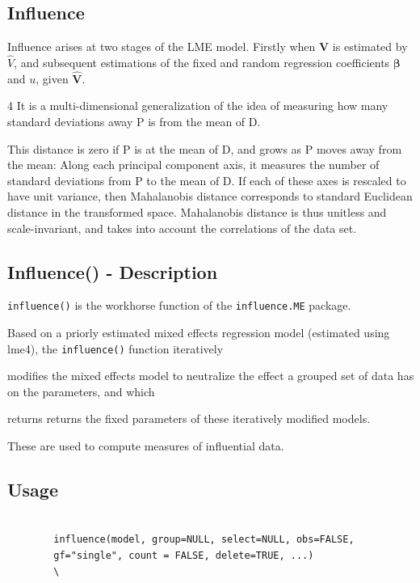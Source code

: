 	
	
	\subsection{Influence}
	
	Influence arises at two stages of the LME model. Firstly when $\mathbf{V}$ is estimated by $\hat{V}$, and subsequent
	estimations of the fixed and random regression coefficients $\mathbf{\beta}$ and $u$, given $\mathbf{\hat{V}}$.
	
	4 It is a multi-dimensional generalization of the idea of measuring how many standard deviations away P is from the mean of D. 
	
	This distance is zero if P is at the mean of D, and grows as P moves away from the mean: Along each principal component axis, it measures the 
	number of standard deviations from P to the mean of D. If each of these axes is rescaled to have unit variance, then Mahalanobis distance corresponds to standard Euclidean distance in the transformed space. Mahalanobis distance is thus unitless and scale-invariant, and takes into account the correlations of the data set.

	\subsection*{Influence() - Description}
	\texttt{influence()} is the workhorse function of the \texttt{influence.ME} package. 
	
	
	Based on a priorly estimated mixed effects regression model (estimated using lme4), the \texttt{influence()} function iteratively 
	
	modifies the mixed effects model to neutralize the effect a grouped set of data has on the parameters, and which 
	
	returns returns the fixed parameters of these iteratively modified models. 
	
	These are used to compute measures of influential data.
	
	
	
	
	\subsection*{Usage}
	\begin{framed}
		\begin{verbatim}
		
		influence(model, group=NULL, select=NULL, obs=FALSE, 
		gf="single", count = FALSE, delete=TRUE, ...)
		\
		\end{verbatim}
	\end{framed}
	
